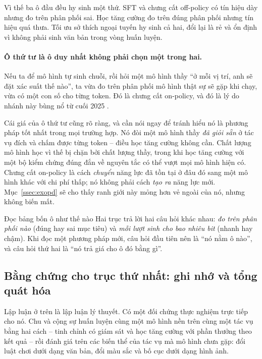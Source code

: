 Vì thế ba ô đầu đều hy sinh một thứ. SFT và chưng cất off-policy có tín hiệu dày nhưng đo trên phân phối sai. Học tăng cường đo trên đúng phân phối nhưng tín hiệu quá thưa. Tối ưu sở thích ngoại tuyến hy sinh cả hai, đổi lại là rẻ và ổn định vì không phải sinh văn bản trong vòng huấn luyện.

\paragraph{Ô thứ tư là ô duy nhất không phải chọn một trong hai.} Nếu ta để mô hình tự sinh chuỗi, rồi hỏi một mô hình thầy ``ở mỗi vị trí, anh sẽ đặt xác suất thế nào'', ta vừa đo trên phân phối mô hình thật sự sẽ gặp khi chạy, vừa có một con số cho từng token. Đó là chưng cất on-policy, và đó là lý do nhánh này bùng nổ từ cuối 2025 \cite{lu2025opd, song2026opdsurvey}.

Cái giá của ô thứ tư cũng rõ ràng, và cần nói ngay để tránh hiểu nó là phương pháp tốt nhất trong mọi trường hợp. Nó đòi một mô hình thầy \emph{đã giỏi sẵn} ở tác vụ đích và chấm được từng token -- điều học tăng cường không cần. Chất lượng mô hình học vì thế bị chặn bởi chất lượng thầy, trong khi học tăng cường với một bộ kiểm chứng đúng đắn về nguyên tắc có thể vượt mọi mô hình hiện có. Chưng cất on-policy là cách \emph{chuyển} năng lực đã tồn tại ở đâu đó sang một mô hình khác với chi phí thấp; nó không phải cách \emph{tạo ra} năng lực mới. Mục~\ref{ssec:exopd} sẽ cho thấy ranh giới này mỏng hơn vẻ ngoài của nó, nhưng không biến mất.

\begin{keyidea}{Đọc bảng bốn ô như thế nào}
Hai trục trả lời hai câu hỏi khác nhau: \emph{đo trên phân phối nào} (đúng hay sai mục tiêu) và \emph{mỗi lượt sinh cho bao nhiêu bit} (nhanh hay chậm). Khi đọc một phương pháp mới, câu hỏi đầu tiên nên là ``nó nằm ô nào'', và câu hỏi thứ hai là ``nó trả giá cho ô đó bằng gì''.
\end{keyidea}

\subsection{Bằng chứng cho trục thứ nhất: ghi nhớ và tổng quát hóa}
\label{ssec:sft_vs_rl_generalization}

Lập luận ở trên là lập luận lý thuyết. Có một đối chứng thực nghiệm trực tiếp cho nó. Chu và cộng sự \cite{chu2025sftrl} huấn luyện cùng một mô hình nền trên cùng một tác vụ bằng hai cách -- tinh chỉnh có giám sát và học tăng cường với phần thưởng theo kết quả -- rồi đánh giá trên các biến thể của tác vụ mà mô hình chưa gặp: đổi luật chơi dưới dạng văn bản, đổi màu sắc và bố cục dưới dạng hình ảnh.

